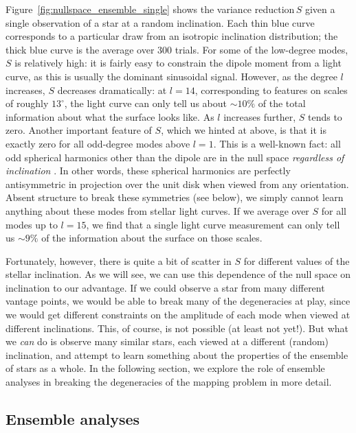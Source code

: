\documentclass[modern]{aastex62}
\newcommand{\shrinkage}{{variance reduction\,}}
\begin{document}
Figure~\ref{fig:nullspace_ensemble_single} shows the \shrinkage $S$
given a single observation of a star at a random inclination.
Each thin blue curve corresponds to a particular draw from an isotropic
inclination distribution; the thick blue curve is the average over 300 trials.
For some of the low-degree modes, $S$ is relatively high: it is
fairly easy to constrain the dipole moment from a light curve, as this is
usually the dominant sinusoidal signal. However, as the degree $l$
increases, $S$ decreases dramatically: at $l = 14$, corresponding
to features on scales of roughly $13^\circ$, the light curve
can only tell us about $\sim 10\%$ of the total information about what the
surface looks like. As $l$ increases further, $S$ tends to zero.
Another important feature of $S$, which we hinted at above,
is that it is exactly zero for
all odd-degree modes above $l = 1$. This is a well-known fact: all odd spherical
harmonics other than the dipole are in the null space \emph{regardless of
    inclination} \citep[e.g.,][]{Luger2019}. In other words, these spherical
harmonics are perfectly antisymmetric in projection over the unit disk
when viewed from any orientation. Absent structure to break these symmetries
(see below), we simply cannot learn anything about these modes from
stellar light curves. If we average over $S$ for all modes up to $l=15$,
we find that a single light curve measurement can only tell us $\sim 9\%$
of the information about the surface on those scales.

Fortunately, however, there is quite a bit of scatter in $S$
for different values of the stellar inclination.
As we will see, we can use this dependence of the null space on inclination to our
advantage. If we could observe a star from many different vantage points,
we would be able to break many of the degeneracies at play, since we
would get different constraints on the amplitude of each mode when viewed
at different inclinations. This, of course, is not possible (at least not
yet!). But what we \emph{can} do is observe many similar stars, each viewed
at a different (random) inclination, and attempt to learn something about
the properties of the ensemble of stars as a whole.
In the
following section, we explore the role of ensemble analyses in breaking
the degeneracies of the mapping problem in more detail.


\subsection{Ensemble analyses}
\label{sec:ensemble}
\end{document}
